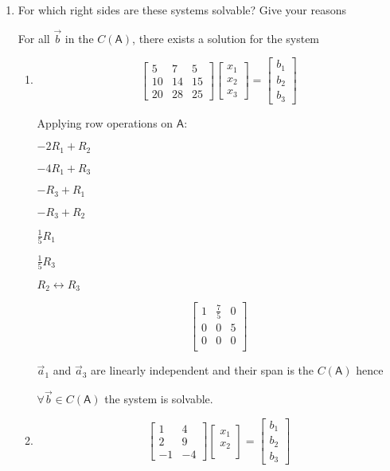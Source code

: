 \documentclass[a4paper, 11pt]{article}
\newcommand{\mat}[1]{\boldsymbol { \mathsf{#1}} }
\begin{document}
\begin{enumerate}
\item For which right sides are these systems solvable? Give your reasons

For all $\vec b$ in the $C(\mat A)$, there exists a solution for the system

\begin{enumerate}
\item
\[ 
\left[ \begin{array}{ccc}
5  &   7 &  5\\
10  &   14 &  15\\
20 & 28 & 25
\end{array} \right]
%
\left[ \begin{array}{c}
 x_1\\
 x_2\\
x_3 
\end{array} \right]
%
= \left[ \begin{array}{c}
 b_1\\
 b_2\\
 b_3 
\end{array} \right]
\]

Applying row operations on $\mat A$: 

\begin{center}
$-2R_1 + R_2$

$-4R_1 + R_3$

$-R_3 + R_1$

$-R_3 + R_2$

$\frac{1}{5} R_1$

$\frac{1}{5} R_3$

$ R_2 \leftrightarrow R_3$
\end{center}


\[ 
\left[ \begin{array}{ccc}
1 & \frac{7}{5} & 0 \\
0 & 0 & 5 \\
0 & 0 & 0 \\
\end{array} \right]
\]

$\vec a_1$ and $\vec a_3$ are linearly independent and their span is the $C(\mat A)$ hence 

$\forall \vec b \in C(\mat A)$  the system is solvable.


\item
\[ 
\left[ \begin{array}{cc}
1  &   4 \\
2  &  9 \\
-1 & -4 
\end{array} \right]
%
\left[ \begin{array}{c}
 x_1\\
 x_2\\
\end{array} \right]
%
= \left[ \begin{array}{c}
 b_1\\
 b_2\\
 b_3 
\end{array} \right]
\]


\end{enumerate}
\end{enumerate}
\end{document}
